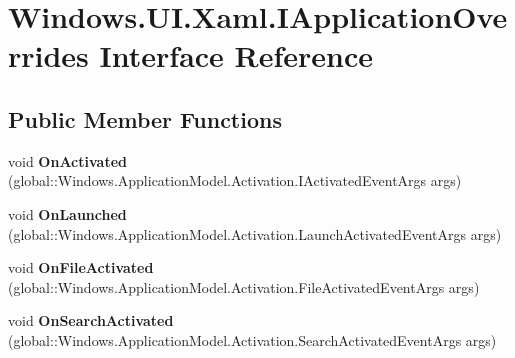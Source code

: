 \hypertarget{interface_windows_1_1_u_i_1_1_xaml_1_1_i_application_overrides}{}\section{Windows.\+U\+I.\+Xaml.\+I\+Application\+Overrides Interface Reference}
\label{interface_windows_1_1_u_i_1_1_xaml_1_1_i_application_overrides}
\subsection*{Public Member Functions}
\begin{DoxyCompactItemize}
\item 
\mbox{\label{interface_windows_1_1_u_i_1_1_xaml_1_1_i_application_overrides_a3d67b84df0aa6c2353ba9dfdf0711d43}} 
void {\bfseries On\+Activated} (global\+::\+Windows.\+Application\+Model.\+Activation.\+I\+Activated\+Event\+Args args)
\item 
\mbox{\label{interface_windows_1_1_u_i_1_1_xaml_1_1_i_application_overrides_ab33b8fe098161d6f117c096208d4caa4}} 
void {\bfseries On\+Launched} (global\+::\+Windows.\+Application\+Model.\+Activation.\+Launch\+Activated\+Event\+Args args)
\item 
\mbox{\label{interface_windows_1_1_u_i_1_1_xaml_1_1_i_application_overrides_a9e67cc475338afb3d85b18949e08b15f}} 
void {\bfseries On\+File\+Activated} (global\+::\+Windows.\+Application\+Model.\+Activation.\+File\+Activated\+Event\+Args args)
\item 
\mbox{\label{interface_windows_1_1_u_i_1_1_xaml_1_1_i_application_overrides_aa8ed1fee4ec2b422d17e20f81f1d7c31}} 
void {\bfseries On\+Search\+Activated} (global\+::\+Windows.\+Application\+Model.\+Activation.\+Search\+Activated\+Event\+Args args)
\item 
\mbox{\label{interface_windows_1_1_u_i_1_1_xaml_1_1_i_application_overrides_aae46c198cf7ea67cfcbf175e03b9c9d6}} 

\end{DoxyCompactItemize}
